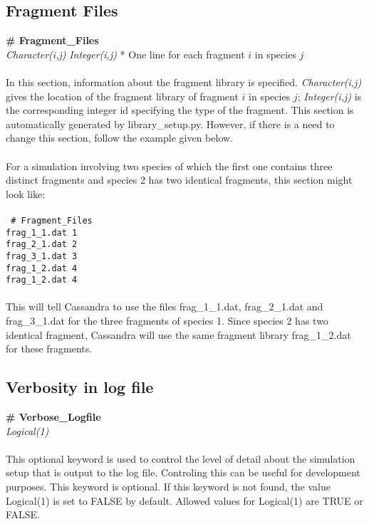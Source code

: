 {{{\subsection{Fragment Files}\label{sec:Fragment_Files}
{\bf \# Fragment\_Files} \\
{\it Character(i,j)} {\it Integer(i,j)} * One line for each fragment $i$ in species $j$ \\ \\
%
In this section, information about the fragment library is specified. {\it Character(i,j)} gives
the location of the fragment library of fragment $i$ in species $j$; {\it Integer(i,j)} is the
corresponding integer id specifying the type of the fragment. This section is automatically
generated by library\_setup.py. However, if there is a need to change this section, follow the example
given below. \\ \\
%
For a simulation involving two species of which the first one contains three distinct fragments and species 2
has two identical fragments, this section might look like: \\ \\
%
\texttt{
\# Fragment\_Files  \\
frag\_1\_1.dat 1 \\
frag\_2\_1.dat 2 \\
frag\_3\_1.dat 3 \\
frag\_1\_2.dat 4 \\
frag\_1\_2.dat 4 \\ \\
}
%
This will tell Cassandra to use the files frag\_1\_1.dat, frag\_2\_1.dat and frag\_3\_1.dat for the three
fragments of species 1. Since species 2 has two identical fragment, Cassandra will use the same
fragment library frag\_1\_2.dat for these fragments. 

%
%

\subsection{Verbosity in log file}\label{sec:Verbose_Logfile}
{\bf \# Verbose\_Logfile} \\
{\it Logical(1)} \\ \\
%
This optional keyword is used to control the level of detail about the simulation
setup that is output to the log file. Controling this can be useful for development
purposes. This keyword is optional. If this keyword is not found,
the value Logical(1) is set to FALSE by default. Allowed values for Logical(1) are
TRUE or FALSE.

}}}
